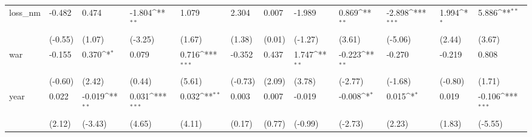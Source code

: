 \def\sym#1{\ifmmode^{#1}\else\(^{#1}\)\fi}
\begin{tabular}{p{1.5cm} p{2cm} p{1.7cm} p{1.7cm} p{1.7cm} p{1.7cm} p{1.7cm} p{1.7cm} p{1.7cm} p{1.7cm} p{1.7cm} p{1.7cm}}
\hline
loss\_nm         &   -0.482         &    0.474         &   -1.804\sym{**} &    1.079         &    2.304         &    0.007         &   -1.989         &    0.869\sym{**} &   -2.898\sym{***}&    1.994\sym{*}  &    5.886\sym{**} \\
                &  (-0.55)         &   (1.07)         &  (-3.25)         &   (1.67)         &   (1.38)         &   (0.01)         &  (-1.27)         &   (3.61)         &  (-5.06)         &   (2.44)         &   (3.67)         \\
war             &   -0.155         &    0.370\sym{*}  &    0.079         &    0.716\sym{***}&   -0.352         &    0.437         &    1.747\sym{**} &   -0.223\sym{**} &   -0.270         &   -0.219         &    0.808         \\
                &  (-0.60)         &   (2.42)         &   (0.44)         &   (5.61)         &  (-0.73)         &   (2.09)         &   (3.78)         &  (-2.77)         &  (-1.68)         &  (-0.80)         &   (1.71)         \\
year            &    0.022         &   -0.019\sym{**} &    0.031\sym{***}&    0.032\sym{**} &    0.003         &    0.007         &   -0.019         &   -0.008\sym{*}  &    0.015\sym{*}  &    0.019         &   -0.106\sym{***}\\
                &   (2.12)         &  (-3.43)         &   (4.65)         &   (4.11)         &   (0.17)         &   (0.77)         &  (-0.99)         &  (-2.73)         &   (2.23)         &   (1.83)         &  (-5.55)         \\
\end{tabular}
\def\sym#1{\ifmmode^{#1}\else\(^{#1}\)\fi}
